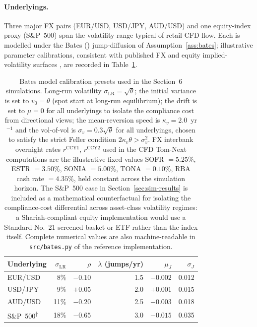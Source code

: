 \documentclass[preprint,12pt,authoryear]{elsarticle}
\theoremstyle{definition}
\begin{document}
\paragraph{Underlyings.} Three major FX pairs (EUR/USD, USD/JPY,
AUD/USD) and one equity-index proxy (S\&P~500) span the volatility
range typical of retail CFD flow. Each is modelled under the Bates
(\citeyear{Bates1996}) jump-diffusion of
Assumption~\ref{ass:bates}; illustrative parameter calibrations,
consistent with published FX and equity implied-volatility surfaces
\citep{Andersen2009,Bates1996}, are recorded in
Table~\ref{tab:calibration}.

\begin{table}[!ht]
\centering
\small
\caption{Bates model calibration presets used in the Section~6
simulations. Long-run volatility
$\sigma_{\text{LR}} = \sqrt{\theta}$; the initial variance is set
to $v_0 = \theta$ (spot start at long-run equilibrium); the drift
is set to $\mu = 0$ for all underlyings to isolate the compliance
cost from directional views; the mean-reversion speed is
$\kappa_v = 2.0$~yr$^{-1}$ and the vol-of-vol is
$\sigma_v = 0.3\sqrt{\theta}$ for all underlyings, chosen to
satisfy the strict Feller condition
$2\kappa_v\theta > \sigma_v^{2}$. FX interbank overnight rates
$r^{\text{CCY1}}$, $r^{\text{CCY2}}$ used in the CFD Tom-Next
computations are the illustrative fixed values SOFR $= 5.25\%$,
ESTR $= 3.50\%$, SONIA $= 5.00\%$, TONA $= 0.10\%$, RBA cash rate
$= 4.35\%$, held constant across the simulation horizon. The
S\&P~500 case in Section~\ref{sec:sim-results} is included as a
mathematical counterfactual for isolating the compliance-cost
differential across asset-class volatility regimes: a
Shariah-compliant equity implementation would use a Standard
No.~21-screened basket or ETF rather than the index itself.
Complete numerical values are also machine-readable in
\texttt{src/bates.py} of the reference implementation.}
\label{tab:calibration}
\begin{tabular}{@{}lrrrrr@{}}
\toprule
\textbf{Underlying}
    & $\sigma_{\text{LR}}$ & $\rho$
    & $\lambda$ (jumps/yr) & $\mu_J$ & $\sigma_J$ \\
\midrule
EUR/USD & 8\%  & $-0.10$ & 1.5 & $-0.002$ & 0.012 \\
USD/JPY & 9\%  & $+0.05$ & 2.0 & $+0.001$ & 0.015 \\
AUD/USD & 11\% & $-0.20$ & 2.5 & $-0.003$ & 0.018 \\
S\&P~500\textsuperscript{$\dagger$} & 18\% & $-0.65$ & 3.0 & $-0.015$ & 0.035 \\
\bottomrule
\end{tabular}
\end{table}
\end{document}
